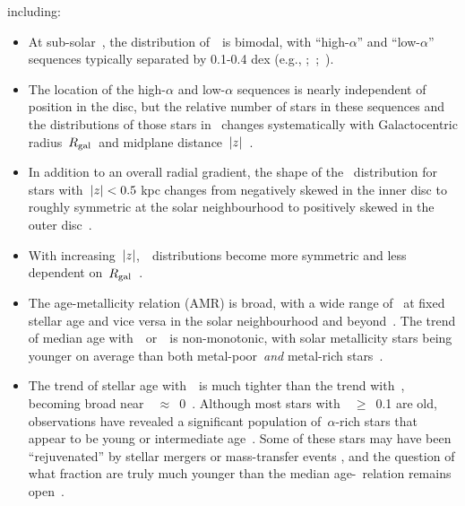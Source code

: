 including: 
\begin{itemize} 
	\item At sub-solar~\feh, the distribution of~\afe~is bimodal, with 
	``high-$\alpha$'' and ``low-$\alpha$'' sequences typically separated by 
	0.1-0.4 dex (e.g., 
	\citealp{Fuhrmann1998};~\citealp*{Bensby2003};~\citealp{Adibekyan2012, 
	Vincenzo2021a}). 

	\item The location of the high-$\alpha$ and low-$\alpha$ sequences is 
	nearly independent of position in the disc, but the relative number of 
	stars in these sequences and the distributions of those stars in 
    \feh~changes systematically with Galactocentric radius~$R_\text{gal}$~and midplane 
	distance~$\left|z\right|$~\citep{Nidever2014, Hayden2015, Weinberg2019}. 

	\item In addition to an overall radial gradient, the shape of the 
	\feh~distribution for stars with~$\left|z\right| < 0.5$ kpc changes from negatively 
	skewed in the inner disc to roughly symmetric at the solar neighbourhood 
	to positively skewed in the outer disc~\citep{Hayden2015, Weinberg2019}. 

	\item With increasing~$\left|z\right|$,~\feh~distributions become more symmetric 
	and less dependent on~$R_\text{gal}$~\citep{Hayden2015}. 

	\item The age-metallicity relation (AMR) is broad, with a wide range of 
	\feh~at fixed stellar age and vice versa in the solar neighbourhood 
	\citep{Edvardsson1993} and beyond~\citep{Feuillet2019}. The trend of 
	median age with~\feh~or~\oh~is non-monotonic, with solar metallicity 
	stars being younger on average than both metal-poor~\textit{and} 
	metal-rich stars~\citep{Feuillet2018, Feuillet2019, Lu2022}. 

	\item The trend of stellar age with~\afe~is much tighter than the trend 
	with~\feh, becoming broad near~\afe~$\approx$~0~\citep{Feuillet2018, 
	Feuillet2019}. Although most stars with~\afe~$\geq$~0.1 are old, 
	observations have revealed a significant population of~$\alpha$-rich stars 
	that appear to be young or intermediate age~\citep{Chiappini2015, 
	Martig2015, Martig2016, Warfield2021}. Some of these stars may have been 
	``rejuvenated'' by stellar mergers or mass-transfer events 
	\citep{Jofre2016, Yong2016, Izzard2018, SilvaAguirre2018}, and 
	the question of what fraction are truly much younger than the median 
	age-\afe~relation remains open~\citep{Hekker2019, Miglio2021}. 
\end{itemize} 
